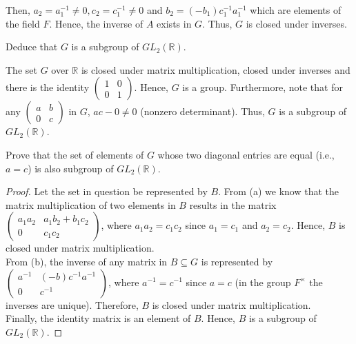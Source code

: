 \documentclass[12pt]{article}
\newcommand{\R}{\mathbb{R}}
\newenvironment{problem}[2][Problem]{\begin{trivlist} \item[\hskip \labelsep {\bfseries #1}\hskip \labelsep {\bfseries #2.}]}{\end{trivlist}}
\newenvironment{solution}[1][Solution]{\begin{trivlist} \item[\hskip \labelsep {\bfseries #1}]}{\end{trivlist}}
\begin{document}
\begin{problem}{10}
\begin{enumerate}
\begin{solution}
  Then, $a_{2} = a_{1}^{-1} \neq 0 , c_{2} = c_{1}^{-1}\neq 0$ and $b_{2} = (- b_{1})c_{1}^{-1}a_{1}^{-1}$ which are elements of the field $F$. Hence, the inverse of $A$ exists in $G$.  Thus, $G$ is closed under inverses.
\end{solution}
  \item Deduce that $G$ is a subgroup of $GL_{2}(\R)$.
\begin{solution}
  The set $G$ over $\R$ is closed under matrix multiplication, closed under inverses and there is the identity $\begin{pmatrix} 1 & 0\\ 0 & 1\end{pmatrix}$. Hence, $G$ is a group. Furthermore, note that for any $\begin{pmatrix} a & b\\ 0 & c\end{pmatrix}$ in $G$, $ac-0\neq 0$ (nonzero determinant). Thus, $G$ is a subgroup of $GL_{2}(\R)$.
\end{solution}
  \item Prove that the set of elements of $G$ whose two diagonal entries are equal (i.e., $a=c$) is also subgroup of $GL_{2}(\R)$.
\begin{proof}
  Let the set in question be represented by $B$. From (a) we know that the matrix multiplication of two elements in $B$ results in the matrix $\begin{pmatrix}a_{1}a_{2} & a_{1}b_{2}+b_{1}c_{2}\\ 0 & c_{1}c_{2}\end{pmatrix}$, where $a_{1}a_{2} = c_{1}c_{2}$ since $a_{1}=c_{1}$ and $a_{2}=c_{2}$. Hence, $B$ is closed under matrix multiplication.\\

  From (b), the inverse of any matrix in $B\subseteq G$ is represented by $\begin{pmatrix} a^{-1} & (-b)c^{-1}a^{-1}\\ 0 & c^{-1} \end{pmatrix}$, where $a^{-1} = c^{-1}$ since $a=c$ (in the group $F^{\times}$ the inverses are unique). Therefore, $B$ is closed under matrix multiplication.\\
 Finally, the identity matrix is an element of $B$. Hence, $B$ is a subgroup of $GL_{2}(\R)$.
\end{proof}
\end{enumerate}
\end{problem}
\end{document}
